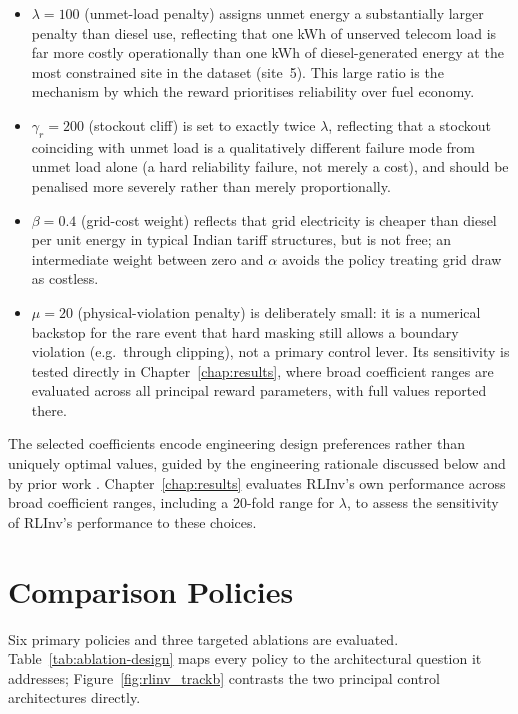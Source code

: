 \begin{itemize}
\item \textbf{$\lambda = 100$} (unmet-load penalty) assigns unmet energy
a substantially larger penalty than diesel use, reflecting that one
kWh of unserved telecom load is far more costly operationally than one
kWh of diesel-generated energy at the most constrained site in the
dataset (site~5). This large ratio is the mechanism by which the reward
prioritises reliability over fuel economy.
\item \textbf{$\gamma_r = 200$} (stockout cliff) is set to exactly twice
$\lambda$, reflecting that a stockout coinciding with unmet load is a
qualitatively different failure mode from unmet load alone (a hard
reliability failure, not merely a cost), and should be penalised more
severely rather than merely proportionally.
\item \textbf{$\beta = 0.4$} (grid-cost weight) reflects that grid
electricity is cheaper than diesel per unit energy in typical Indian
tariff structures, but is not free; an intermediate weight between zero
and $\alpha$ avoids the policy treating grid draw as costless.
\item \textbf{$\mu = 20$} (physical-violation penalty) is deliberately
small: it is a numerical backstop for the rare event that hard masking
still allows a boundary violation (e.g.\ through clipping), not a primary
control lever. Its sensitivity is tested directly in
Chapter~\ref{chap:results}, where broad coefficient ranges are evaluated
across all principal reward parameters, with full values reported there.
\end{itemize}

The selected coefficients encode engineering design preferences rather
than uniquely optimal values, guided by the engineering rationale
discussed below and by prior work
\citep{hu2024performance}. Chapter~\ref{chap:results} evaluates RLInv's
own performance across broad coefficient ranges, including a 20-fold
range for $\lambda$, to assess the sensitivity of RLInv's performance to
these choices.


\section{Comparison Policies}
\label{sec:comparison_policies}

Six primary policies and three targeted ablations are evaluated.
Table~\ref{tab:ablation-design} maps every policy to the architectural
question it addresses; Figure~\ref{fig:rlinv_trackb} contrasts the two
principal control architectures directly.

